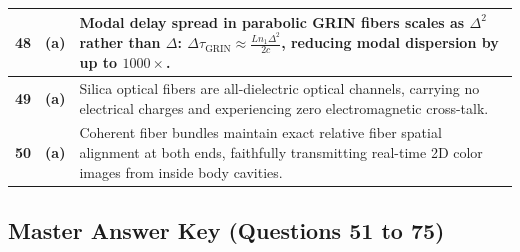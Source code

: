 {\begin{tabularx}{\textwidth}{|c|c|X|}
\textbf{48} & \textbf{(a)} & Modal delay spread in parabolic GRIN fibers scales as $\Delta^2$ rather than $\Delta$: $\Delta\tau_{\text{GRIN}} \approx \frac{L n_1 \Delta^2}{2c}$, reducing modal dispersion by up to $1000\times$. \\ \hline
\textbf{49} & \textbf{(a)} & Silica optical fibers are all-dielectric optical channels, carrying no electrical charges and experiencing zero electromagnetic cross-talk. \\ \hline
\textbf{50} & \textbf{(a)} & Coherent fiber bundles maintain exact relative fiber spatial alignment at both ends, faithfully transmitting real-time 2D color images from inside body cavities. \\ \hline
\end{tabularx}
}

\newpage

\subsection*{Master Answer Key (Questions 51 to 75)}

